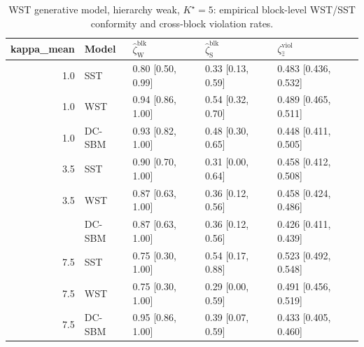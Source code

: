 \begin{table}
\centering
\caption{WST generative model, hierarchy weak, $K^\star=5$: empirical block-level WST/SST conformity and cross-block violation rates.}
\centering
\begin{tabular}[t]{rllll}
\toprule
kappa_mean & Model & $\widehat\zeta_{\mathrm{W}}^{\mathrm{blk}}$ & $\widehat\zeta_{\mathrm{S}}^{\mathrm{blk}}$ & $\zeta^{\mathrm{viol}}_{\hat z}$\\
\midrule
1.0 & SST & 0.80 [0.50, 0.99] & 0.33 [0.13, 0.59] & 0.483 [0.436, 0.532]\\
1.0 & WST & 0.94 [0.86, 1.00] & 0.54 [0.32, 0.70] & 0.489 [0.465, 0.511]\\
1.0 & DC-SBM & 0.93 [0.82, 1.00] & 0.48 [0.30, 0.65] & 0.448 [0.411, 0.505]\\
3.5 & SST & 0.90 [0.70, 1.00] & 0.31 [0.00, 0.64] & 0.458 [0.412, 0.508]\\
3.5 & WST & 0.87 [0.63, 1.00] & 0.36 [0.12, 0.56] & 0.458 [0.424, 0.486]\\
\addlinespace
3.5 & DC-SBM & 0.87 [0.63, 1.00] & 0.36 [0.12, 0.56] & 0.426 [0.411, 0.439]\\
7.5 & SST & 0.75 [0.30, 1.00] & 0.54 [0.17, 0.88] & 0.523 [0.492, 0.548]\\
7.5 & WST & 0.75 [0.30, 1.00] & 0.29 [0.00, 0.59] & 0.491 [0.456, 0.519]\\
7.5 & DC-SBM & 0.95 [0.86, 1.00] & 0.39 [0.07, 0.59] & 0.433 [0.405, 0.460]\\
\bottomrule
\end{tabular}
\end{table}
